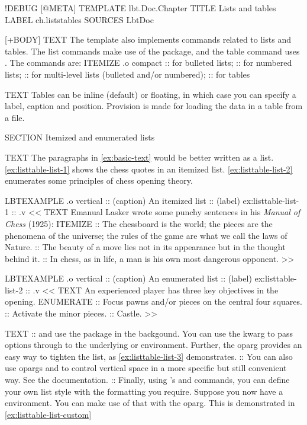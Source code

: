 \begin{lbt}
  !DEBUG
  [@META]
    TEMPLATE lbt.Doc.Chapter
    TITLE Lists and tables
    LABEL ch.liststables
    SOURCES LbtDoc

  [+BODY]
    TEXT The  template also implements commands related to lists and tables. The list commands make use of the  package, and the table command uses . The commands are:
    ITEMIZE .o compact
    ::  for bulleted lists;
    ::  for numbered lists;
    ::  for multi-level lists (bulleted and/or numbered);
    ::  for tables

    TEXT Tables can be inline (default) or floating, in which case you can specify a label, caption and position. Provision is made for loading the data in a table from a file.

    SECTION Itemized and enumerated lists

    TEXT The paragraphs in \cref{ex:basic-text} would be better written as a list. \cref{ex:listtable-list-1} shows the chess quotes in an itemized list. \cref{ex:listtable-list-2} enumerates some principles of chess opening theory.

    LBTEXAMPLE .o vertical
    :: (caption) An itemized list
    :: (label) ex:listtable-list-1
    :: .v <<
      TEXT Emanual Lasker wrote some punchy sentences in his \emph{Manual of Chess} (1925):
      ITEMIZE
      :: The chessboard is the world; the pieces are the phenomena of the universe; the rules of the game are what we call the laws of Nature.
      :: The beauty of a move lies not in its appearance but in the thought behind it.
      :: In chess, as in life, a man is his own most dangerous opponent.
    >>

    LBTEXAMPLE .o vertical
    :: (caption) An enumerated list
    :: (label) ex:listtable-list-2
    :: .v <<
      TEXT An experienced player has three key objectives in the opening.
      ENUMERATE
      :: Focus pawns and/or pieces on the central four squares.
      :: Activate the minor pieces.
      :: Castle.
    >>

    TEXT
    ::  and  use the  package in the backgound. You can use the kwarg  to pass options through to the underlying  or  environment. Further, the oparg  provides an easy way to tighten the list, as \cref{ex:listtable-list-3} demonstrates.
    :: You can also use opargs  and  to control vertical space in a more specific but still convenient way. See the documentation.
    :: Finally, using 's  and  commands, you can define your own list style with the formatting you require. Suppose you now have a  environment. You can make use of that with the  oparg. This is demonstrated in \cref{ex:listtable-list-custom}


\end{lbt}
